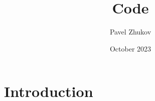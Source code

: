 \documentclass{article}
\title{Code}
\author{Pavel Zhukov}
\date{October 2023}
\begin{document}
\maketitle

\section{Introduction}
\end{document}
